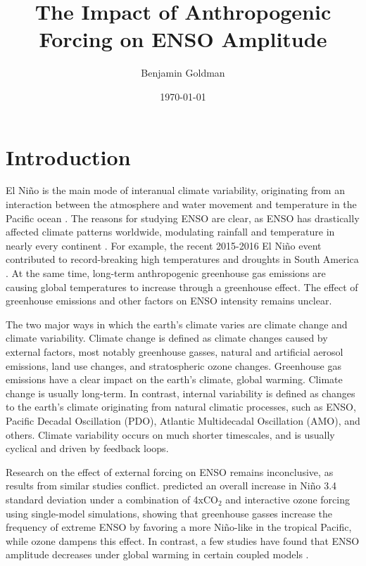 \message{ !name(papernew.tex)}\documentclass[11pt]{article}
\author{Benjamin Goldman}
\date{\today}
\title{The Impact of Anthropogenic Forcing on ENSO Amplitude}
\begin{document}
\section{Introduction}
\label{sec:org72159d6}
El Niño is the main mode of interanual climate variability, originating from an interaction between the atmosphere and water movement and temperature in the Pacific ocean \citep{bjerknes1969atmospheric}. The reasons for studying ENSO are clear, as ENSO has drastically affected climate patterns worldwide, modulating rainfall and temperature in nearly every continent \citep{ropelewski1987global}. For example, the recent 2015-2016 El Niño event contributed to record-breaking high temperatures and droughts in South America \citep{jimenez2016record}. At the same time, long-term anthropogenic greenhouse gas emissions are causing global temperatures to increase through a greenhouse effect. The effect of greenhouse emissions and other factors on ENSO intensity remains unclear.

The two major ways in which the earth's climate varies are climate change and climate variability. Climate change is defined as climate changes caused by external factors, most notably greenhouse gasses, natural and artificial aerosol emissions, land use changes, and stratospheric ozone changes. Greenhouse gas emissions have a clear impact on the earth's climate, global warming. Climate change is usually long-term. In contrast, internal variability is defined as changes to the earth's climate originating from natural climatic processes, such as ENSO, Pacific Decadal Oscillation (PDO), Atlantic Multidecadal Oscillation (AMO), and others. Climate variability occurs on much shorter timescales, and is usually cyclical and driven by feedback loops.

Research on the effect of external forcing on ENSO remains inconclusive, as results from similar studies conflict. \citet{nowack2017role} predicted an overall increase in Niño 3.4 standard deviation under a combination of 4xCO\(_2\) and interactive ozone forcing using single-model simulations, showing that greenhouse gasses increase the frequency of extreme ENSO by favoring a more Niño-like in the tropical Pacific, while ozone dampens this effect. In contrast, a few studies have found that ENSO amplitude decreases under global warming in certain coupled models \citep{kohyama2018weakening}.
\end{document}

